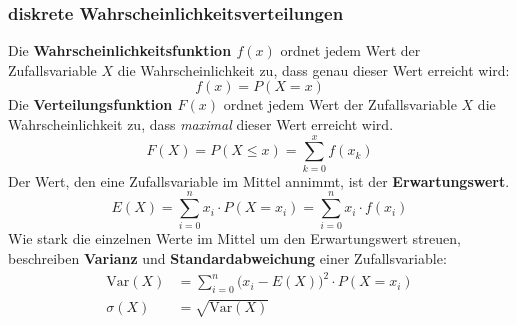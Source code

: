 \subsubsection{diskrete Wahrscheinlichkeitsverteilungen}
Die \textbf{Wahrscheinlichkeitsfunktion $f(x)$} ordnet jedem Wert der Zufallsvariable $X$ die Wahrscheinlichkeit zu, dass genau dieser Wert erreicht wird:
\begin{equation}
    f(x)=P(X=x)
\end{equation}
Die \textbf{Verteilungsfunktion $F(x)$} ordnet jedem Wert der Zufallsvariable $X$ die Wahrscheinlichkeit zu, dass \emph{maximal} dieser Wert erreicht wird.
\begin{equation}
    F(X)=P(X \leq x) = \sum_{k=0}^x f(x_k)
\end{equation}
Der Wert, den eine Zufallsvariable im Mittel annimmt, ist der \textbf{Erwartungswert}.
\begin{equation}
    E(X) = \sum_{i=0}^n x_i \cdot P(X=x_i) = \sum_{i=0}^n x_i \cdot f(x_i)
\end{equation}
Wie stark die einzelnen Werte im Mittel um den Erwartungswert streuen, beschreiben \textbf{Varianz} und \textbf{Standardabweichung} einer Zufallsvariable:
\begin{align}
    \mathrm{Var}(X) &= \sum_{i=0}^{n} \big(x_i - E(X)\big)^2 \cdot P(X=x_i) \\
    \sigma(X) &= \sqrt{\mathrm{Var}(X)}
\end{align}


